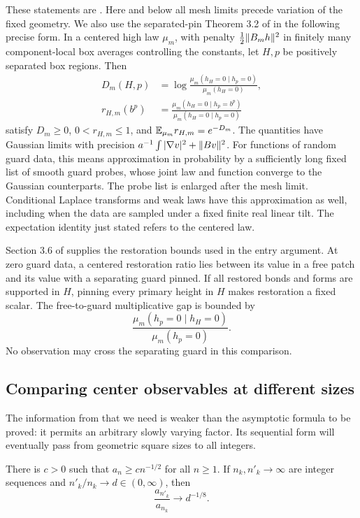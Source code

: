 These statements are \cite[Sections 1.1 and 6,
Theorems 2.4, 2.5, and 3.1]{X}.
Here and below all mesh limits precede variation of the fixed geometry.
We also use the separated-pin Theorem
3.2 of \cite{X} in the following precise form.
In a centered high law \(\mu_m\), with penalty
\(\frac12\lVert B_mh\rVert^2\) in finitely many component-local box
averages controlling the constants, let \(H,p\) be positively
separated box regions.  Then
\begin{align*}
 D_m(H,p)&=\log\frac{\mu_m(h_H=0\mid h_p=0)}{\mu_m(h_H=0)},\\
 r_{H,m}(b^p)&=
 \frac{\mu_m(h_H=0\mid h_p=b^p)}{\mu_m(h_H=0\mid h_p=0)}
\end{align*}
satisfy \(D_m\ge0\), \(0<r_{H,m}\le1\), and
\(\mathbb E_{\mu_m}r_{H,m}=e^{-D_m}\).  The quantities have Gaussian
limits with precision \(a^{-1}\int|\nabla v|^2+\lVert Bv\rVert^2\).
For functions of random guard data, this means approximation in
probability by a sufficiently long fixed list of smooth guard probes,
whose joint law and function converge to the Gaussian counterparts.
The probe list is enlarged after the mesh limit.  Conditional Laplace
transforms and weak laws have this approximation as well, including
when the data are sampled under a fixed finite real linear tilt.
The expectation identity just stated refers to the centered law.

Section 3.6 of \cite{X} supplies the restoration bounds used in
the entry argument.  At zero guard data, a centered restoration ratio
lies between its value in a free patch and its value with a separating
guard pinned.  If all restored bonds and forms are supported in \(H\),
pinning every primary height in \(H\) makes restoration a fixed scalar.
The free-to-guard multiplicative gap is bounded by
\[
                  \frac{\mu_m(h_p=0\mid h_H=0)}{\mu_m(h_p=0)}.
\]
No observation may cross the separating guard in this comparison.

\subsection{Comparing center observables at different sizes}

The information from \cite{S} that we need is weaker than the
asymptotic formula to be proved: it permits an arbitrary slowly varying
factor.  Its sequential form will eventually pass from geometric
square sizes to all integers.

\begin{lemma}\label{inp:regular-variation}
There is \(c>0\) such that \(a_n\ge cn^{-1/2}\) for all \(n\ge1\).
If \(n_k,n'_k\to\infty\) are integer sequences and
\(n'_k/n_k\to d\in(0,\infty)\), then
\begin{equation}\label{inp:center-ratio}
                        \frac{a_{n'_k}}{a_{n_k}}\longrightarrow d^{-1/8}.
\end{equation}
\end{lemma}

